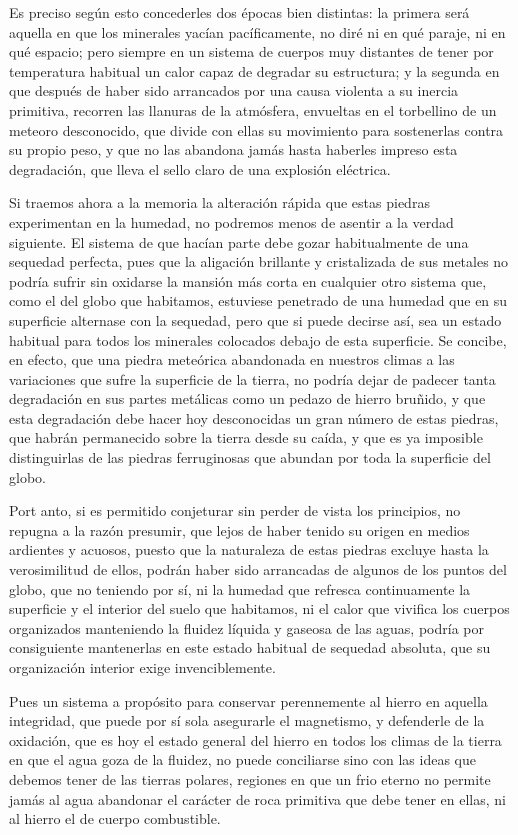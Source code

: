 \documentclass[a4paper, 11pt, oneside, polutonikogreek, spanish]{article}
\begin{document}
Es preciso según esto concederles dos épocas bien distintas: la primera será aquella en que los minerales yacían pacíficamente, no diré ni en qué paraje, ni en qué espacio; pero siempre en un sistema de cuerpos muy distantes de tener por temperatura habitual un calor capaz de degradar su estructura; y la segunda en que después de haber sido arrancados por una causa violenta a su inercia primitiva, recorren las llanuras de la atmósfera, envueltas en el torbellino de un meteoro desconocido, que divide con ellas su movimiento para sostenerlas contra su propio peso, y que no las abandona jamás hasta haberles impreso esta degradación, que lleva el sello claro de una explosión eléctrica.

Si traemos ahora a la memoria la alteración rápida que estas piedras experimentan en la humedad, no podremos menos de asentir a la verdad siguiente. El sistema de que hacían parte debe gozar habitualmente de una sequedad perfecta, pues que la aligación brillante y cristalizada de sus metales no podría sufrir sin oxidarse la mansión más corta en cualquier otro sistema que, como el del globo que habitamos, estuviese penetrado de una humedad que en su superficie alternase con la sequedad, pero que si puede decirse así, sea un estado habitual para todos los minerales colocados debajo de esta superficie. Se concibe, en efecto, que una piedra meteórica abandonada en nuestros climas a las variaciones que sufre la superficie de la tierra, no podría dejar de padecer tanta degradación en sus partes metálicas como un pedazo de hierro bruñido, y que esta degradación debe hacer hoy desconocidas un gran número de estas piedras, que habrán permanecido sobre la tierra desde su caída, y que es ya imposible distinguirlas de las piedras ferruginosas que abundan por toda la superficie del globo.

Port anto, si es permitido conjeturar sin perder de vista los principios, no repugna a la razón presumir, que lejos de haber tenido su origen en medios ardientes y acuosos, puesto que la naturaleza de estas piedras excluye hasta la verosimilitud de ellos, podrán haber sido arrancadas de algunos de los puntos del globo, que no teniendo por sí, ni la humedad que refresca continuamente la superficie y el interior del suelo que habitamos, ni el calor que vivifica los cuerpos organizados manteniendo la fluidez líquida y gaseosa de las aguas, podría por consiguiente mantenerlas en este estado habitual de sequedad absoluta, que su organización interior exige invenciblemente.

Pues un sistema a propósito para conservar perennemente al hierro en aquella integridad, que puede por sí sola asegurarle el magnetismo, y defenderle de la oxidación, que es hoy el estado general del hierro en todos los climas de la tierra en que el agua goza de la fluidez, no puede conciliarse sino con las ideas que debemos tener de las tierras polares, regiones en que un frio eterno no permite jamás al agua abandonar el carácter de roca primitiva que debe tener en ellas, ni al hierro el de cuerpo combustible.
\end{document}
